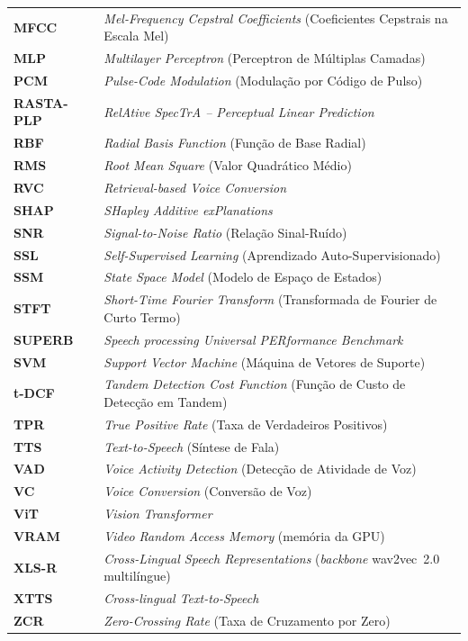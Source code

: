 \documentclass[12pt,a4paper]{article}
\begin{document}
\begin{longtable}{@{}>{\raggedright\arraybackslash}p{2.5cm}
		>{\raggedright\arraybackslash}p{11.3cm}@{}}
	\textbf{MFCC}    & \textit{Mel-Frequency Cepstral Coefficients} (Coeficientes Cepstrais na Escala Mel) \\
	\textbf{MLP}     & \textit{Multilayer Perceptron} (Perceptron de Múltiplas Camadas) \\
	\textbf{PCM}     & \textit{Pulse-Code Modulation} (Modulação por Código de Pulso) \\
	\textbf{RASTA-PLP} & \textit{RelAtive SpecTrA -- Perceptual Linear Prediction} \\
	\textbf{RBF}     & \textit{Radial Basis Function} (Função de Base Radial) \\
	\textbf{RMS}     & \textit{Root Mean Square} (Valor Quadrático Médio) \\
	\textbf{RVC}     & \textit{Retrieval-based Voice Conversion} \\
	\textbf{SHAP}    & \textit{SHapley Additive exPlanations} \\
	\textbf{SNR}     & \textit{Signal-to-Noise Ratio} (Relação Sinal-Ruído) \\
	\textbf{SSL}     & \textit{Self-Supervised Learning} (Aprendizado Auto-Supervisionado) \\
	\textbf{SSM}     & \textit{State Space Model} (Modelo de Espaço de Estados) \\
	\textbf{STFT}    & \textit{Short-Time Fourier Transform} (Transformada de Fourier de Curto Termo) \\
	\textbf{SUPERB}  & \textit{Speech processing Universal PERformance Benchmark} \\
	\textbf{SVM}     & \textit{Support Vector Machine} (Máquina de Vetores de Suporte) \\
	\textbf{t-DCF}   & \textit{Tandem Detection Cost Function} (Função de Custo de Detecção em Tandem) \\
	\textbf{TPR}     & \textit{True Positive Rate} (Taxa de Verdadeiros Positivos) \\
	\textbf{TTS}     & \textit{Text-to-Speech} (Síntese de Fala) \\
	\textbf{VAD}     & \textit{Voice Activity Detection} (Detecção de Atividade de Voz) \\
	\textbf{VC}      & \textit{Voice Conversion} (Conversão de Voz) \\
	\textbf{ViT}     & \textit{Vision Transformer} \\
	\textbf{VRAM}    & \textit{Video Random Access Memory} (memória da GPU) \\
	\textbf{XLS-R}   & \textit{Cross-Lingual Speech Representations} (\textit{backbone} wav2vec~2.0 multilíngue) \\
	\textbf{XTTS}    & \textit{Cross-lingual Text-to-Speech} \\
	\textbf{ZCR}     & \textit{Zero-Crossing Rate} (Taxa de Cruzamento por Zero) \\
\end{longtable}
\endgroup
\setcounter{table}{0}
\end{document}
